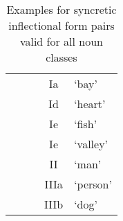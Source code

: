 \begin{table}\centering
\caption{Examples for syncretic inflectional form pairs valid for all noun classes}\label{syncreticInflFormPairExamples}
\resizebox{1\linewidth}{!} {
\begin{tabular}{ y{30mm}  y{30mm}  y{30mm} c p{20mm} }
	&	&&& \\\hline
{}		& 		& 		&Ia & ‘bay’ \\
		& 		& 		&Id & ‘heart’ \\
		& 			& 		&Ie & ‘fish’ \\
		& 		& 		&Ie & ‘valley’ \\
		& 		& 		&II & ‘man’ \\
		& 		& 		&IIIa & ‘person’ \\%
{}		& 		& 	&IIIb & ‘dog’ \\\hline
\end{tabular}}
\end{table}

